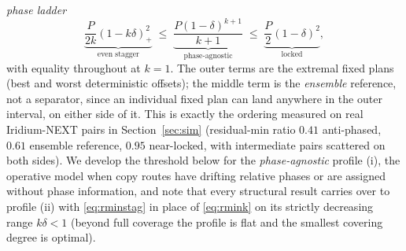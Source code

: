 \documentclass[twocolumn,3p,times,procedia]{elsarticle}
\theoremstyle{plain}
\theoremstyle{remark}
\begin{document}
\emph{phase ladder}
\begin{equation}\label{eq:ladder}
\underbrace{\frac{P}{2k}(1-k\delta)_+^2}_{\text{even stagger}}
\;\le\;
\underbrace{\frac{P(1-\delta)^{k+1}}{k+1}}_{\text{phase-agnostic}}
\;\le\;
\underbrace{\frac{P}{2}(1-\delta)^2}_{\text{locked}},
\end{equation}
with equality throughout at $k{=}1$. The outer terms are the extremal
fixed plans (best and worst deterministic offsets); the middle term is
the \emph{ensemble} reference, not a separator, since an individual
fixed plan can land anywhere in the outer interval, on either side of it. This
is exactly the ordering
measured on real Iridium-NEXT pairs in Section~\ref{sec:sim}
(residual-min ratio $0.41$ anti-phased, $0.61$ ensemble reference,
$0.95$ near-locked, with intermediate pairs scattered on both sides). We develop the threshold below for the
\emph{phase-agnostic} profile (i), the operative model when copy
routes have drifting relative phases or are assigned without phase
information, and note that every structural result carries over to
profile (ii) with \eqref{eq:rminstag} in place of \eqref{eq:rmink} on
its strictly decreasing range $k\delta<1$ (beyond full coverage the
profile is flat and the smallest covering degree is optimal).
\end{document}

